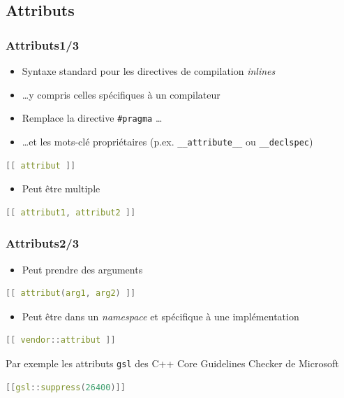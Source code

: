 \documentclass[C++.tex]{subfiles}
\begin{document}
\subsection*{Attributs}
\begin{frame}[fragile]
	\frametitle{Attributs\titlehfill{}1/3}
	\begin{itemize}
		\item Syntaxe standard pour les directives de compilation \textit{inlines}
		\item \ldots y compris celles spécifiques à un compilateur
		\item Remplace la directive \lstinline|#pragma| \ldots
		\item \ldots{}et les mots-clé propriétaires (p.ex. \lstinline|__attribute__| ou \lstinline|__declspec|)
	\end{itemize}

	\begin{lstlisting}[language=C++]
[[ attribut ]]\end{lstlisting}

	\begin{itemize}
		\item Peut être multiple
	\end{itemize}

	\begin{lstlisting}[language=C++]
[[ attribut1, attribut2 ]]\end{lstlisting}
\end{frame}

\begin{frame}[fragile]
	\frametitle{Attributs\titlehfill{}2/3}
	\begin{itemize}
		\item Peut prendre des arguments
	\end{itemize}

	\begin{lstlisting}[language=C++]
[[ attribut(arg1, arg2) ]]\end{lstlisting}

	\begin{itemize}
		\item Peut être dans un \textit{namespace} et spécifique à une implémentation
	\end{itemize}

	\begin{lstlisting}[language=C++]
[[ vendor::attribut ]]\end{lstlisting}

	\begin{block}{Par exemple}
		les attributs \lstinline|gsl| des \og C++ Core Guidelines Checker\fg{} de Microsoft
		
	\begin{lstlisting}[language=C++]
[[gsl::suppress(26400)]]\end{lstlisting}
	\end{block}
\end{frame}
\end{document}
